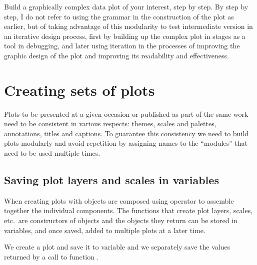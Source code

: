 \documentclass[krantz2]{krantz}\usepackage{knitr}%
\begin{document}
\begin{playground}
  Build a graphically complex data plot of your interest, step by step. By step by step, I do not refer to using the grammar in the construction of the plot as earlier, but of taking advantage of this modularity to test intermediate version in an iterative design process, first by building up the complex plot in stages as a tool in debugging, and later using iteration in the processes of improving the graphic design of the plot and improving its readability and effectiveness.
\end{playground}

\section{Creating sets of plots}\label{sec:plot:sets:of}
Plots to be presented at a given occasion or published as part of the same work need to be consistent in various respects: themes, scales and palettes, annotations, titles and captions. To guarantee this consistency we need to build plots modularly and avoid repetition by assigning names to the ``modules'' that need to be used multiple times.

\subsection{Saving plot layers and scales in variables}

When creating plots with \ggplot{} objects are composed using operator \code{+} to assemble together the individual components. The functions that create plot layers, scales, etc.\ are constructors of objects and the objects they return can be stored in variables, and once saved, added to multiple plots at a later time.

We create a plot and save it to variable  and we separately save the values returned by a call to function .

\begin{knitrout}\footnotesize
{}\color{fgcolor}\begin{kframe}
\begin{alltt}
 \hlkwb{<-} \hlstd{(} 
                 \hlstd{(}   
                  \hlstd{=}  \hlopt{+}
          \hlstd{()}

 \hlkwb{<-} \hlstd{(} \hlstd{=} \hlstd{,}
                \hlstd{=} \hlstd{,}
                \hlstd{=} \hlstd{,}
                \hlstd{=} \hlstd{)}
\end{alltt}
\end{kframe}
\end{knitrout}
\end{document}
